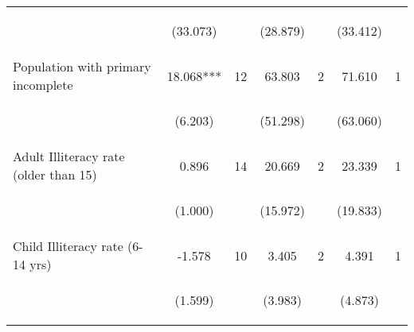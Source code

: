\begin{tabular}{lcccccc}
\vspace{4pt} &  \begin{footnotesize}(33.073)\end{footnotesize}   & &
			    \begin{footnotesize}(28.879)\end{footnotesize}   & &
			    \begin{footnotesize}(33.412)\end{footnotesize}   &
			     \\          

Population with primary incomplete   &  18.068***   &  12  &   63.803  &  2 &  71.610  &  1   \\

\vspace{4pt} &  \begin{footnotesize}(6.203)\end{footnotesize}   & &
			    \begin{footnotesize}(51.298)\end{footnotesize}   & &
			    \begin{footnotesize}(63.060)\end{footnotesize}   &
			     \\          

Adult Illiteracy rate (older than 15)   &  0.896   &  14  &   20.669  &  2 &  23.339  &  1   \\

\vspace{4pt} &  \begin{footnotesize}(1.000)\end{footnotesize}   & &
			    \begin{footnotesize}(15.972)\end{footnotesize}   & &
			    \begin{footnotesize}(19.833)\end{footnotesize}   &
			     \\          

Child Illiteracy rate (6-14 yrs)   &  -1.578   &  10  &   3.405  &  2 &  4.391  &  1   \\

\vspace{4pt} &  \begin{footnotesize}(1.599)\end{footnotesize}   & &
			    \begin{footnotesize}(3.983)\end{footnotesize}   & &
			    \begin{footnotesize}(4.873)\end{footnotesize}   &
			     \\          


\end{tabular}
